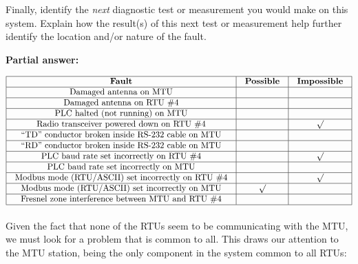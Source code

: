 Finally, identify the {\it next} diagnostic test or measurement you would make on this system.  Explain how the result(s) of this next test or measurement help further identify the location and/or nature of the fault.







\noindent
{\bf Partial answer:}


$$\vbox{\offinterlineskip
\halign{\strut
\vrule \quad\hfil # \ \hfil & 
\vrule \quad\hfil # \ \hfil & 
\vrule \quad\hfil # \ \hfil \vrule \cr
\noalign{\hrule}
%
{\bf Fault} & {\bf Possible} & {\bf Impossible} \cr
%
\noalign{\hrule}
%
Damaged antenna on MTU &  &  \cr
%
\noalign{\hrule}
%
Damaged antenna on RTU \#4 &  &  \cr
%
\noalign{\hrule}
%
PLC halted (not running) on MTU &  &  \cr
%
\noalign{\hrule}
%
Radio transceiver powered down on RTU \#4 &  & $\surd$ \cr
%
\noalign{\hrule}
%
``TD'' conductor broken inside RS-232 cable on MTU &  &  \cr
%
\noalign{\hrule}
%
``RD'' conductor broken inside RS-232 cable on MTU &  &  \cr
%
\noalign{\hrule}
%
PLC baud rate set incorrectly on RTU \#4 &  & $\surd$ \cr
%
\noalign{\hrule}
%
PLC baud rate set incorrectly on MTU &  &  \cr
%
\noalign{\hrule}
%
Modbus mode (RTU/ASCII) set incorrectly on RTU \#4 &  & $\surd$ \cr
%
\noalign{\hrule}
%
Modbus mode (RTU/ASCII) set incorrectly on MTU & $\surd$ &  \cr
%
\noalign{\hrule}
%
Fresnel zone interference between MTU and RTU \#4 &  &  \cr
%
\noalign{\hrule}
} %
}$$ %








Given the fact that none of the RTUs seem to be communicating with the MTU, we must look for a problem that is common to all.  This draws our attention to the MTU station, being the only component in the system common to all RTUs:


